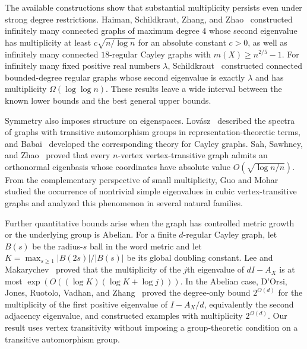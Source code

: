 \documentclass[11pt]{article}
\theoremstyle{definition}
\theoremstyle{remark}
\begin{document}
The available constructions show that substantial multiplicity persists even under strong degree restrictions. Haiman, Schildkraut, Zhang, and Zhao~\cite[Theorems~1.4 and~1.5]{HaimanSchildkrautZhangZhao2022HighMultiplicity} constructed infinitely many connected graphs of maximum degree $4$ whose second eigenvalue has multiplicity at least $c\sqrt{n/\log n}$ for an absolute constant $c>0$, as well as infinitely many connected $18$-regular Cayley graphs with $m(X)\geq n^{2/5}-1$. For infinitely many fixed positive real numbers $\lambda$, Schildkraut~\cite[Theorem~1.5]{Schildkraut2023FixedSecondEigenvalue} constructed connected bounded-degree regular graphs whose second eigenvalue is exactly $\lambda$ and has multiplicity $\Omega(\log\log n)$. These results leave a wide interval between the known lower bounds and the best general upper bounds.

Symmetry also imposes structure on eigenspaces. Lov\'asz~\cite{Lovasz1975TransitiveSpectra} described the spectra of graphs with transitive automorphism groups in representation-theoretic terms, and Babai~\cite{Babai1979CayleySpectra} developed the corresponding theory for Cayley graphs. Sah, Sawhney, and Zhao~\cite[Theorem~1.4]{SahSawhneyZhao2022Eigenbasis} proved that every $n$-vertex vertex-transitive graph admits an orthonormal eigenbasis whose coordinates have absolute value $O(\sqrt{\log n/n})$. From the complementary perspective of small multiplicity, Guo and Mohar~\cite{GuoMohar2024SimpleEigenvalues} studied the occurrence of nontrivial simple eigenvalues in cubic vertex-transitive graphs and analyzed this phenomenon in several natural families.

Further quantitative bounds arise when the graph has controlled metric growth or the underlying group is Abelian. For a finite $d$-regular Cayley graph, let $B(s)$ be the radius-$s$ ball in the word metric and let $K=\max_{s\geq1}|B(2s)|/|B(s)|$ be its global doubling constant. Lee and Makarychev~\cite[Theorem~3.1]{LeeMakarychev2009MultiplicityGrowth} proved that the multiplicity of the $j$th eigenvalue of $dI-A_X$ is at most $\exp(O((\log K)(\log K+\log j)))$. In the Abelian case, D'Orsi, Jones, Ruotolo, Vadhan, and Zhang~\cite{DOrsiJonesRuotoloVadhanZhang2025AbelianCayley} proved the degree-only bound $2^{O(d)}$ for the multiplicity of the first positive eigenvalue of $I-A_X/d$, equivalently the second adjacency eigenvalue, and constructed examples with multiplicity $2^{\Omega(d)}$. Our result uses vertex transitivity without imposing a group-theoretic condition on a transitive automorphism group.
\end{document}
